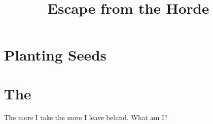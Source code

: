 \documentclass[a4paper,openany]{book}
\title{Escape from the Horde}
\begin{document}
\glsunsetall
{}





\mainmatter

\glsresetall


\chapter{Planting Seeds}

\begin{multicols}{2}



\end{multicols}

\stopcontents[segments]

%

\chapter{The }
\epigraph{%
    The more I take the more I leave behind.
    What am I?
}{}



\begin{multicols}{2}



\warrenMap





\end{multicols}

\startappendix





\cleardoublepage
\end{document}
